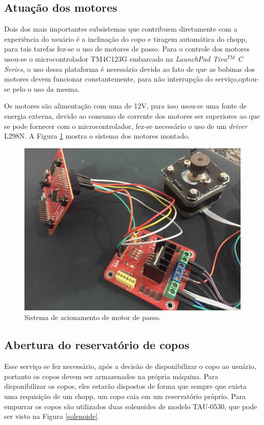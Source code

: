 \subsection{Atuação dos motores}
Dois dos mais importantes subsistemas que contribuem diretamente com a experiência do usuário é a inclinação do copo e tiragem automática do chopp,
para tais tarefas fez-se o uso de motores de passo.
Para o controle dos motores usou-se o microcontrolador TM4C123G embarcado na \textit{LaunchPad Tiva$^{TM}$ C Series}, o uso dessa plataforma é necessário devido ao fato de que as bobinas dos motores devem funcionar constantemente, para não interrupção do serviço,optou-se pelo o uso da mesma.


Os motores são alimentação com uma de 12V, para isso usou-se uma fonte de energia externa, devido ao consumo de corrente dos motores ser superiores ao que se pode fornecer com o microcontrolador, fez-se necessário o uso de um \textit{driver} L298N. A Figura \ref{motor} mostra o sistema dos motores montado.

\begin{figure}[!h]
            \centering
         	\includegraphics[scale= 0.1]{figuras/motor.jpg}
            \caption{Sistema de acionamento de motor de passo.}
            \label{motor}
\end{figure}

\newpage
\subsection{Abertura do reservatório de copos}

 Esse serviço se fez necessário, após a decisão de disponibilizar o copo ao usuário, portanto os copos devem ser armazenados na própria máquina. Para disponibilizar os copos, eles estarão dispostos de forma que sempre que exista uma requisição de um chopp, um copo caia em um reservatório próprio. Para empurrar os copos são utilizados duas solenoides de modelo TAU-0530, que pode ser visto na Figura \ref{solenoide}. 

